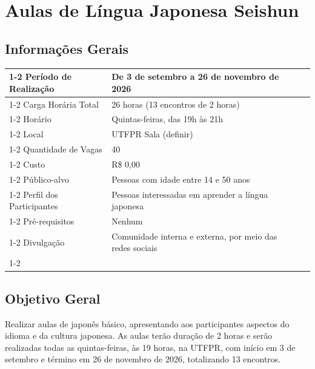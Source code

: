 \documentclass[12pt,a4paper]{article}
\begin{document}
\section*{Aulas de Língua Japonesa Seishun}

\subsection*{Informações Gerais}

\begin{table}[H]
\begin{tabular}{|l|l|lll}
\cline{1-2}
Período de Realização    & De 3 de setembro a 26 de novembro de 2026               &  &  &  \\ \cline{1-2}
Carga Horária Total      & 26 horas (13 encontros de 2 horas)                      &  &  &  \\ \cline{1-2}
Horário                  & Quintas-feiras, das 19h às 21h                          &  &  &  \\ \cline{1-2}
Local                    & UTFPR Sala (definir)                                          &  &  &  \\ \cline{1-2}
Quantidade de Vagas      & 40                                                      &  &  &  \\ \cline{1-2}
Custo                    & R\$ 0,00                                                &  &  &  \\ \cline{1-2}
Público-alvo             & Pessoas com idade entre 14 e 50 anos                    &  &  &  \\ \cline{1-2}
Perfil dos Participantes & Pessoas interessadas em aprender a língua japonesa      &  &  &  \\ \cline{1-2}
Pré-requisitos           & Nenhum                                                  &  &  &  \\ \cline{1-2}
Divulgação               & Comunidade interna e externa, por meio das redes sociais &  &  &  \\ \cline{1-2}
\end{tabular}
\end{table}

\subsection*{Objetivo Geral}

Realizar aulas de japonês básico, apresentando aos participantes aspectos do idioma e da cultura japonesa. As aulas terão duração de 2 horas e serão realizadas todas as quintas-feiras, às 19 horas, na UTFPR, com início em 3 de setembro e término em 26 de novembro de 2026, totalizando 13 encontros.
\end{document}
